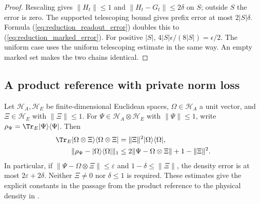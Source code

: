 \begin{proof}\leanok
    Rescaling gives $\lVert H_t\rVert\leq1$ and
    $\lVert H_t-G_t\rVert\leq2\delta$ on $S$; outside $S$ the error
    is zero. The supported telescoping bound gives prefix error at most
    $2|S|\delta$. Formula (\ref{eq:reduction_readout_error}) doubles this
    to (\ref{eq:reduction_marked_error}). For positive $|S|$,
    $4|S|\epsilon/(8|S|)=\epsilon/2$.
    The uniform case uses the uniform telescoping estimate in the same
    way. An empty marked set makes the two chains identical.
\end{proof}

\subsection{A product reference with private norm loss}

\begin{theorem}
    \label{thm:product_reference_density_error}
    Let $\mathcal H_A,\mathcal H_E$ be finite-dimensional Euclidean spaces,
    $\Omega\in\mathcal H_A$ a unit vector, and $\Xi\in\mathcal H_E$ with
    $\lVert\Xi\rVert\leq1$. For $\Psi\in\mathcal H_A\otimes\mathcal H_E$
    with $\lVert\Psi\rVert\leq1$, write
    $\rho_\Psi=\Tr_E|\Psi\rangle\langle\Psi|$. Then
    \begin{align}
        \Tr_E|\Omega\otimes\Xi\rangle\langle\Omega\otimes\Xi|
          &=\lVert\Xi\rVert^2|\Omega\rangle\langle\Omega|,\\
        \lVert\rho_\Psi-|\Omega\rangle\langle\Omega|\rVert_1
          &\leq 2\lVert\Psi-\Omega\otimes\Xi\rVert
              +1-\lVert\Xi\rVert^2.
    \end{align}
    In particular, if $\lVert\Psi-\Omega\otimes\Xi\rVert\leq\varepsilon$
    and $1-\delta\leq\lVert\Xi\rVert$, the density error is at most
    $2\varepsilon+2\delta$. Neither $\Xi\ne0$ nor $\delta\leq1$ is required.
    These estimates give the explicit constants in the passage from the
    product reference to the physical density in
    \cite[Section~8.1]{OpenAI2026PolynomialPEPS}.
\end{theorem}

